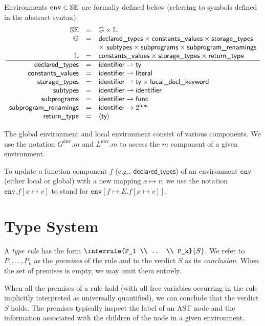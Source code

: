 \documentclass{book}
\newcommand\constantsvalues[0]{\textsf{constants\_values}}
\newcommand\storagetypes[0]{\textsf{storage\_types}}
\newcommand\returntype[0]{\textsf{return\_type}}
\newcommand\declaredtypes[0]{\textsf{declared\_types}}
\newcommand\subtypes[0]{\textsf{subtypes}}
\newcommand\subprograms[0]{\textsf{subprograms}}
\newcommand\subprogramrenamings[0]{\textsf{subprogram\_renamings}}
\newcommand\tenv[0]{\texttt{env}}
\begin{document}
Environments $\tenv \in \staticenvs$ are formally defined below (referring to symbols defined in the abstract syntax):
\[
\begin{array}{rcl}
\staticenvs 	          &=& \mathbb{G} \times \mathbb{L}\\
\mathbb{G} 	            &=& \declaredtypes \times \constantsvalues \times \storagetypes\\
  			                & & \times\ \subtypes \times \subprograms \times \subprogramrenamings\\
\mathbb{L} 	            &=& \constantsvalues \times \storagetypes \times \returntype\\
\hline
\declaredtypes	        &=& \identifier \partialto \ty\\
\constantsvalues        &=& \identifier \partialto \literal\\
\storagetypes           &=& \identifier \partialto \ty \times \localdeclkeyword\\
\subtypes		            &=& \identifier \partialto \identifier\\
\subprograms	          &=& \identifier \partialto \func\\
\subprogramrenamings	  &=& \identifier \rightarrow 2^\func\\
\returntype             &=& \langle \ty \rangle
\end{array}
\]

The global environment and local environment consist of various components.
We use the notation $G^\tenv.m$ and $L^\tenv.m$ to access the $m$ component of a given environment.

To update a function component $f$ (e.g., $\declaredtypes$) of an environment $\tenv$ (either local or global)
with a new mapping $x \mapsto v$, we use the notation $\tenv.f[x \mapsto v]$ to stand for $\tenv[f \mapsto E.f[x \mapsto v]]$.

\section{Type System}
A \emph{type rule} has the form $\inferrule{P_1 \\ .. \\ P_k}{S}$.
We refer to $P_1,\ldots,P_k$ as the \emph{premises} of the rule and to the verdict $S$ as its \emph{conclusion}.
When the set of premises is empty, we may omit them entirely.

When all the premises of a rule hold (with all free variables occurring in the rule implicitly interpreted as universally quantified),
we can conclude that the verdict $S$ holds.
%
The premises typically inspect the label of an AST node and the information associated with the children of the node in a given environment.
\end{document}
